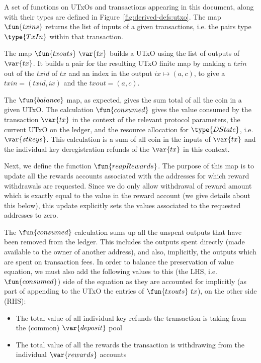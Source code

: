 \documentclass[11pt,a4paper,dvipsnames]{article}
\newcommand{\DState}{\type{DState}}
\newcommand{\TxIn}{\type{TxIn}}
\theoremstyle{definition}
\theoremstyle{definition}
\begin{document}
A set of functions on UTxOs and transactions appearing in this document,
along with their types are defined in Figure~\ref{fig:derived-defs:utxo}.
The map $\fun{txins}$ returns the list of inputs of a given transactions, i.e.
the pairs type $\TxIn$ within that transaction.

The map $\fun{txouts}~ \var{tx}$ builds a UTxO using the
list of outputs of $\var{tx}$. It builds a pair for the resulting UTxO
finite map by making a $txin$ out of the $txid$ of $tx$ and an index in the output $ix \mapsto (a,c)$, to give a $txin = (txid, ix)$ and the
$txout=(a,c)$.

The $\fun{balance}$ map, as expected, gives the sum total of all the coin in
a given UTxO. The calculation $\fun{consumed}$ gives the value consumed
by the transaction $\var{tx}$ in the context of the relevant protocol
parameters, the current UTxO on the ledger, and the resource allocation for
$\DState$, i.e. $\var{stkeys}$. This calculation is a sum of all coin in the inputs of
$\var{tx}$  and the individual key
deregistration refunds of the $\var{tx}$ in this context.

Next, we define the function $\fun{reapRewards}$. The purpose of this map is
to update all the rewards accounts associated with the addresses for which
reward withdrawals are requested. Since we do only allow withdrawal of reward
amount which is exactly equal to the value in the reward account (we
give details about this below), this update explicitly sets the values
associated to the requested addresses to zero.

The $\fun{consumed}$ calculation sums up all the unspent outputs that
have been removed from the ledger. This includes the outputs spent directly
(made available to the owner of another address), and also, implicitly,
the outputs which are spent on transaction fees. In order to balance
the preservation of value equation, we must also add the following values
to this (the LHS, i.e. $\fun{consumed}$) side of the equation as they are
accounted for implicitly (as
part of appending to the UTxO the entries of $\fun{txouts}~{tx}$), on the
other side (RHS):

\begin{itemize}
\item The total value of all individual key refunds the transaction is taking from
the (common) $\var{deposit}$ pool
\item The total value of all the rewards the transaction is withdrawing from
the individual $\var{rewards}$ accounts
\end{itemize}
\end{document}
